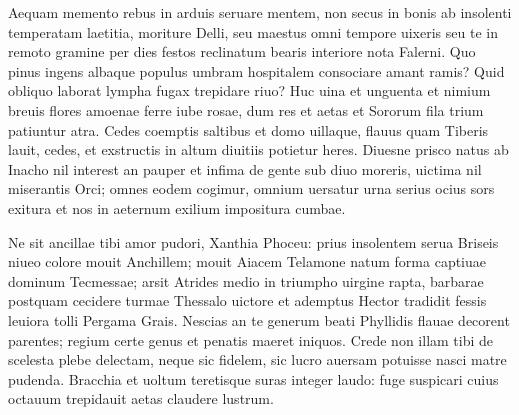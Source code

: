 \documentclass{book}
\newenvironment {carmen} [1] [\relax] 
  {\Titulus \Versus \incipit*\numerus{1}#1}
  {\endVersus}
\newcommand {\Sapphic}   {\Forma \strophae {0 \poena 00 \poena 1}}
\newcommand {\Alcaic}    {\Forma \strophae {0 \poena 01 \poena 2}}
\begin{document}
\begin{carmen}[\Alcaic]


Aequam memento rebus in arduis
 seruare mentem, non secus in bonis
      ab insolenti temperatam
      laetitia, moriture Delli, 
seu maestus omni tempore uixeris               
 seu te in remoto gramine per dies
      festos reclinatum bearis
      interiore nota Falerni. 
Quo pinus ingens albaque populus
 umbram hospitalem consociare amant               
      ramis? Quid obliquo laborat
      lympha fugax trepidare riuo? 
Huc uina et unguenta et nimium breuis
 flores amoenae ferre iube rosae,
      dum res et aetas et Sororum
      fila trium patiuntur atra.                
Cedes coemptis saltibus et domo
 uillaque, flauus quam Tiberis lauit,
      cedes, et exstructis in altum
      diuitiis potietur heres.                
Diuesne prisco natus ab Inacho
 nil interest an pauper et infima
      de gente sub diuo moreris,
      uictima nil miserantis Orci; 
omnes eodem cogimur, omnium               
 uersatur urna serius ocius
      sors exitura et nos in aeternum
      exilium impositura cumbae. 

\end{carmen}

\begin{carmen}[\Sapphic]


Ne sit ancillae tibi amor pudori,
 Xanthia Phoceu: prius insolentem
 serua Briseis niueo colore
      mouit Anchillem; 
mouit Aiacem Telamone natum                
forma captiuae dominum Tecmessae;
 arsit Atrides medio in triumpho
      uirgine rapta, 
barbarae postquam cecidere turmae
 Thessalo uictore et ademptus Hector               
 tradidit fessis leuiora tolli
      Pergama Grais. 
Nescias an te generum beati
 Phyllidis flauae decorent parentes;
 regium certe genus et penatis               
      maeret iniquos. 
Crede non illam tibi de scelesta
 plebe delectam, neque sic fidelem,
 sic lucro auersam potuisse nasci
      matre pudenda.                
Bracchia et uoltum teretisque suras
 integer laudo: fuge suspicari
 cuius octauum trepidauit aetas
      claudere lustrum. 

\end{carmen}
\end{document}
